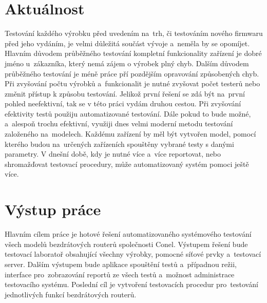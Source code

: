 \section{Aktuálnost}
Testování každého výrobku před uvedením na~trh, či testováním nového firmwaru před jeho vydáním, je velmi důležitá součást vývoje a~neměla by se opomíjet. Hlavním důvodem průběžného testování kompletní funkcionality zařízení je dobré jméno u~zákazníka, který nemá zájem o výrobek plný chyb. Dalším důvodem průběžného testování je méně práce pří pozdějším opravování způsobených chyb. Při zvyšování počtu výrobků a~funkcionalit je nutné zvyšovat počet testerů nebo změnit přístup k způsobu testování. Jelikož první řešení se zdá být na~první pohled neefektivní, tak se v této práci vydám druhou cestou. Při zvyšování efektivity testů použiju automatizované testování. Dále pokud to bude možné, a~alespoň trochu efektivní, využiji dnes velmi moderní metodu testování založeného na~modelech. Každému zařízení by měl být vytvořen model, pomocí kterého budou na~určených zařízeních spouštěny vybrané testy s danými parametry. V dnešní době, kdy je nutné více a~více reportovat, nebo shromažďovat testovací procedury, může automatizovaný systém pomoci ještě více.

\section{Výstup práce}
Hlavním cílem práce je hotové řešení automatizovaného systémového testování všech modelů bezdrátových routerů společnosti Conel. Výstupem  řešení bude testovací laboratoř obsahující všechny výrobky, pomocné síťové prvky a~testovací server. Dalším výstupem bude aplikace spouštění testů a~případnou režii, interface pro~zobrazování reportů ze všech testů a~možnost administrace testovacího systému. Poslední cíl je vytvoření testovacích procedur pro~testování jednotlivých funkcí bezdrátových routerů.

